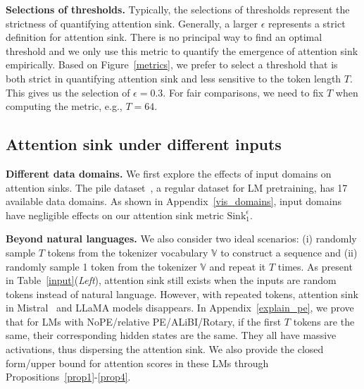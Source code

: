 \documentclass{article} \usepackage{iclr2025_conference,times}
\begin{document}
\textbf{Selections of thresholds.} Typically, the selections of thresholds represent the strictness of quantifying attention sink. Generally, a larger $\epsilon$ represents a strict definition for attention sink. There is no principal way to find an optimal threshold and we only use this metric to quantify the emergence of attention sink empirically. Based on Figure~\ref{metrics}, we prefer to select a threshold that is both strict in quantifying attention sink and less sensitive to the token length $T$. This gives us the selection of $\epsilon=\textrm{0.3}$. For fair comparisons, we need to fix $T$ when computing the metric, e.g., $T=\textrm{64}$. 







































\vspace{-0.2cm}
\subsection{Attention sink under different inputs}\label{section3_3}
\vspace{-0.2cm}

\textbf{Different data domains.} We first explore the effects of input domains on attention sinks. The pile dataset~\citep{gao2020pile}, a regular dataset for LM pretraining, has 17 available data domains. As shown in Appendix~\ref{vis_domains}, input domains have negligible effects on our attention sink metric $\textrm{Sink}_1^{\epsilon}$. 






\textbf{Beyond natural languages.} We also consider two ideal scenarios: (i) randomly sample $T$ tokens from the tokenizer vocabulary $\mathbb{V}$ to construct a sequence and (ii) randomly sample 1 token from the tokenizer $\mathbb{V}$ and repeat it $T$ times. As present in Table~\ref{input}(\emph{Left}), attention sink still exists when the inputs are random tokens instead of natural language. However, with repeated tokens, attention sink in Mistral~\citep{jiang2023mistral} and LLaMA models disappears. In Appendix~\ref{explain_pe}, we prove that for LMs with NoPE/relative PE/ALiBI/Rotary, if the first $T$ tokens are the same, their corresponding hidden states are the same. They all have massive activations, thus dispersing the attention sink. We also provide the closed form/upper bound for attention scores in these LMs through Propositions~\ref{prop1}-\ref{prop4}.
\end{document}
